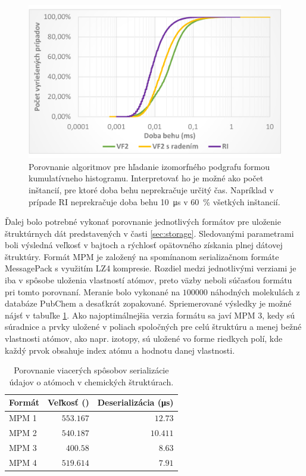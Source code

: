 \documentclass[slovak]{ExcelAtFIT} %
\begin{document}
\begin{figure}[!htb]
	\centering
	\includegraphics[width=1\linewidth]{images/algo_graph.pdf}
	\caption{Porovnanie algoritmov pre hľadanie i\-zo\-morf\-né\-ho podgrafu formou kumulatívneho hi\-sto\-gra\-mu. Interpretovať ho je možné ako počet inštancií, pre ktoré doba behu neprekračuje určitý čas. Napríklad v prípade RI neprekračuje doba behu \SI{10}{\micro \second} v \SI{60}{\percent} všetkých inštancií. }
	\label{fig:algo_graph}
\end{figure}

Ďalej bolo potrebné vykonať porovnanie jednotlivých formátov pre uloženie štruktúrnych dát predstavených v časti \ref{sec:storage}. Sledovanými parametrami boli výsledná veľkosť v bajtoch a rýchlosť opätovného získania plnej dátovej štruktúry. Formát MPM je za\-lo\-že\-ný na spomínanom serializačnom formáte MessagePack s využitím LZ4 kompresie. Rozdiel medzi jednotlivými verziami je iba v spôsobe uloženia vlastností atómov, preto väzby neboli súčasťou formátu pri tomto porovnaní. Meranie bolo vykonané na $100000$ náhodných molekulách z databáze PubChem a desaťkrát zopakované. Spriemerované vý\-sledky je možné nájsť v tabuľke \ref{tab:mpms}. Ako najoptimálnejšia verzia formátu sa javí MPM 3, kedy sú súradnice a prvky uložené v poliach spoločných pre celú štruktúru a menej bežné vlastnosti atómov, ako napr. izotopy, sú uložené vo forme riedkych polí, kde každý prvok obsahuje index atómu a hodnotu danej vlastnosti.

\begin{table}[h]
	\vskip6pt
	\caption{Porovnanie viacerých spôsobov serializácie údajov o atómoch v chemických štruktúrach.}
	\centering
	\begin{tabular}{l|r|r}
		\toprule
		Formát & Veľkosť (\si{\byte}) & Deserializácia (\si{\micro\second}) \\
		\midrule
		MPM 1 & $553.167$ & $12.73$ \\
		MPM 2 & $540.187$ & $10.411$ \\
		MPM 3 & $400.58$ & $8.63$ \\
		MPM 4 & $519.614$ & $7.91$ \\
		\bottomrule
	\end{tabular}
	\label{tab:mpms}
\end{table}
\end{document}
